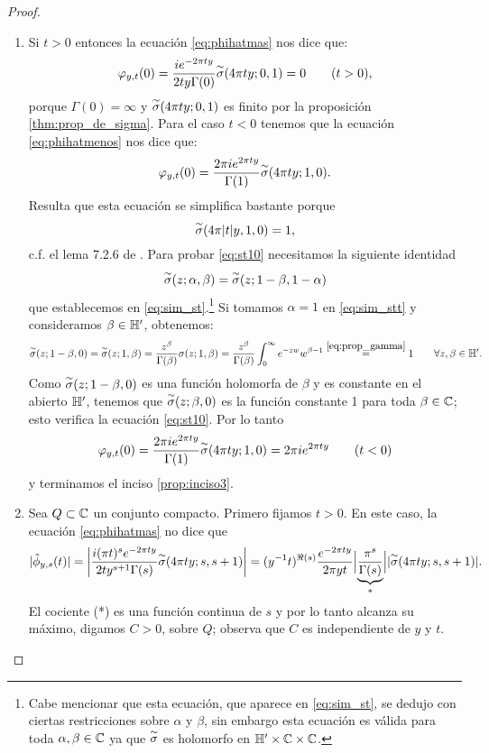 \begin{proof}
\begin{enumerate}[label=\emph{\roman*})]
\item Si $t>0$ entonces la ecuaci\'on \eqref{eq:phihatmas} nos dice que:
  \[
    \varphi_{y,t}(0)=\frac{ie^{-2\pi ty}}{2ty\Gamma(0)}\overset{\sim}{\sigma}(4\pi ty;0,1)=0\qquad(t>0),
  \]
  porque $\Gamma(0)=\infty$ y $\overset{\sim}{\sigma}(4\pi ty;0,1)$ es finito por la proposici\'on
  \ref{thm:prop_de_sigma}. Para el caso $t<0$ tenemos que la ecuaci\'on \eqref{eq:phihatmenos}
    nos dice que:
  \[
    \varphi_{y,t}(0)=\frac{2\pi ie^{2\pi ty}}{\Gamma(1)}\overset{\sim}{\sigma}(4\pi ty;1,0).
  \]
  Resulta que esta ecuaci\'on se simplifica bastante porque
  \begin{equation}\label{eq:st10}
    \overset{\sim}{\sigma}(4\pi|t|y,1,0)=1,
  \end{equation}
  c.f. el lema 7.2.6 de \cite{MiyakeMF}. Para probar \eqref{eq:st10} necesitamos la siguiente identidad
  \begin{equation}\label{eq:sim_stt}
    \overset{\sim}{\sigma}(z;\alpha,\beta)=\overset{\sim}{\sigma}(z;1-\beta,1-\alpha)
  \end{equation}
  que establecemos en \eqref{eq:sim_st}.\footnote{Cabe mencionar que esta ecuaci\'on, que aparece en
    \eqref{eq:sim_st}, se dedujo con ciertas restricciones sobre $\alpha$ y $\beta$, sin embargo esta
    ecuaci\'on es v\'alida para toda $\alpha,\beta\in\mathbb{C}$ ya que $\overset{\sim}{\sigma}$ es holomorfo en
    $\mathbb{H}'\times\mathbb{C}\times\mathbb{C}$.} Si tomamos $\alpha=1$ en \eqref{eq:sim_stt} y consideramos
  $\beta\in\mathbb{H}'$, obtenemos:
  \[
    \overset{\sim}{\sigma}(z;1-\beta,0)
    =\overset{\sim}{\sigma}(z;1,\beta)=\frac{z^{\beta}}{\Gamma(\beta)}\sigma(z;1,\beta)
    =\frac{z^{\beta}}{\Gamma(\beta)}\int_{0}^{\infty}e^{-zw}w^{\beta-1}
    \overset{\eqref{eq:prop_gamma}}{=}1 \qquad\forall z,\beta\in\mathbb{H}'.
  \]
  Como $\overset{\sim}{\sigma}(z;1-\beta,0)$ es una funci\'on holomorfa de $\beta$ y es constante en el abierto $\mathbb{H}'$,
  tenemos que $\overset{\sim}{\sigma}(z;\beta,0)$ es la funci\'on constante 1 para toda $\beta\in\mathbb{C}$; esto verifica
  la ecuaci\'on \eqref{eq:st10}. Por lo tanto
  \[
    \varphi_{y,t}(0)=\frac{2\pi ie^{2\pi ty}}{\Gamma(1)}\overset{\sim}{\sigma}(4\pi ty;1,0)=2\pi i e^{2\pi ty} \qquad(t<0)
  \]
  y terminamos el inciso \ref{prop:inciso3}.
\item Sea $Q\subset\mathbb{C}$ un conjunto compacto. Primero fijamos $t>0$. En este caso, la ecuaci\'on
  \eqref{eq:phihatmas} no dice que
  \[
    |\hat{\phi}_{y,s}(t)|
    =\left| \frac{i(\pi t)^se^{-2\pi ty}}{2ty^{s+1}\Gamma(s)}\overset{\sim}{\sigma}(4\pi ty;s,s+1) \right|
    =(y^{-1}t)^{\Re(s)}\frac{e^{-2\pi ty}}{2\pi yt}
    \Big|\underset{*}{\underbrace{\frac{\pi^s}{\Gamma(s)}}}\Big| |\overset{\sim}{\sigma}(4\pi ty;s,s+1)|.
  \]
  El cociente (*) es una funci\'on continua de $s$ y por lo tanto alcanza su m\'aximo, digamos $C>0$,
  sobre $Q$; observa que $C$ es independiente de $y$ y $t$.


\end{enumerate}
\end{proof}
